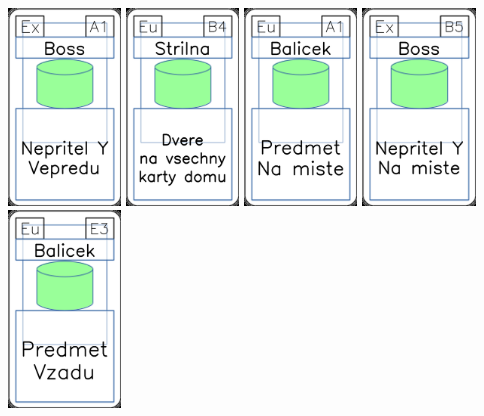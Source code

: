 \documentclass[a4paper]{article}
\begin{document}
	\includegraphics[width=3.0cm]{img-4_0}
	\includegraphics[width=3.0cm]{img-4_38}
	\includegraphics[width=3.0cm]{img-4_30}
	\includegraphics[width=3.0cm]{img-4_9}
	\includegraphics[width=3.0cm]{img-4_22}
\end{document}
